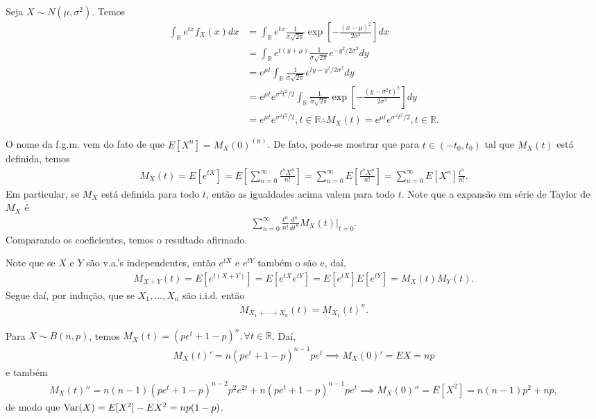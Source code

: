 \documentclass[../Notas.tex]{subfiles}
\begin{document}
\begin{example}
Seja $X\sim N(\mu, \sigma^2)$. Temos
\begin{align*}
    \int_{\mathbb{R}} e^{tx} f_X(x) dx &= \int_{\mathbb{R}} e^{tx}\frac{1}{\sigma\sqrt{2\pi}}\exp[ -\frac{(x-\mu)^2}{2\sigma^2} ] dx \\
    &= \int_{\mathbb{R}} e^{t(y+\mu)}\frac{1}{\sigma\sqrt{2\pi}}e^{-y^2/2\sigma^2} dy \\
    &= e^{\mu t}\int_{\mathbb{R}} \frac{1}{\sigma\sqrt{2\pi}} e^{ty - y^2/2\sigma^2} dy \\
    &= e^{\mu t}e^{\sigma^2t^2/2}\int_{\mathbb{R}} \frac{1}{\sigma\sqrt{2\pi}}\exp[ -\frac{(y-\sigma^2t)^2}{2\sigma^2} ] dy \\
    &= e^{\mu t}e^{\sigma^2 t^2/2}, t\in\mathbb{R} \therefore M_X(t) = e^{\mu t}e^{\sigma^2 t^2/2}, t\in\mathbb{R}.
\end{align*}
\end{example}

O nome da f.g.m. vem do fato de que $E[X^n] = M_X(0)^{(n)}$. De fato, pode-se mostrar que para $t\in(-t_0, t_0)$ tal que $M_X(t)$ está definida, temos
\begin{align*}
    M_X(t) = E[e^{tX}] = E\left[ \sum_{n=0}^{\infty} \frac{t^n X^n}{n!} \right] = \sum_{n=0}^{\infty} E\left[ \frac{t^nX^n}{n!} \right] = \sum_{n=0}^{\infty} E[X^n]\frac{t^n}{n!}.
\end{align*}
Em particular, se $M_X$ está definida para todo $t$, então as igualdades acima valem para todo $t$. Note que a expansão em série de Taylor de $M_X$ é
\begin{align*}
    \sum_{n=0}^{\infty} \frac{t^n}{n!}\frac{d^n}{dt^n}M_X(t)\Big|_{t=0}. 
\end{align*}
Comparando os coeficientes, temos o resultado afirmado.

\begin{remark}
Note que se $X$ e $Y$ são v.a.'s independentes, então $e^{tX}$ e $e^{tY}$ também o são e, daí,
\begin{align*}
    M_{X+Y}(t) = E[e^{t(X+Y)}] = E[e^{tX}e^{tY}] = E[e^{tX}]E[e^{tY}] = M_X(t)M_Y(t).
\end{align*}
Segue daí, por indução, que se $X_1, \dots, X_n$ são i.i.d. então
\begin{align*}
    M_{X_1 + \cdots + X_n}(t) = M_{X_1}(t)^n.
\end{align*}
\end{remark}

\begin{example}
Para $X\sim B(n,p)$, temos $M_X(t) = (pe^t + 1 - p)^n, \forall t\in\mathbb{R}$. Daí,
\begin{align*}
    M_X(t)' = n(pe^t + 1 - p)^{n-1}pe^t \implies M_X(0)' = EX = np
\end{align*}
e também
\begin{align*}
    M_X(t)'' = n(n-1)(pe^t + 1- p)^{n-2}p^2e^{2t} + n(pe^t + 1- p)^{n-1}pe^t \implies M_X(0)'' = E[X^2] = n(n-1)p^2 + np,
\end{align*}
de modo que $\text{Var}(X) = E[X^2] - EX^2 = np(1-p)$.
\end{example}
\end{document}
